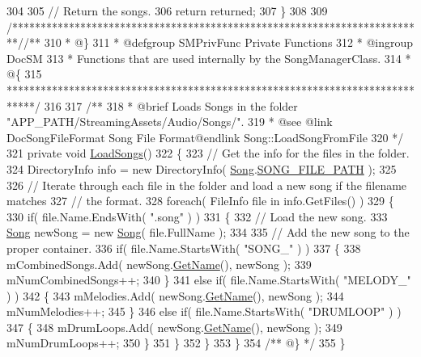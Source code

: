 \begin{DoxyCodeInclude}
304 
305         \textcolor{comment}{// Return the songs.}
306         \textcolor{keywordflow}{return} returned;
307     \}
308 
309     \textcolor{comment}{/*************************************************************************/}\textcolor{comment}{/** }
310 \textcolor{comment}{     * @\}}
311 \textcolor{comment}{     * @defgroup SMPrivFunc Private Functions}
312 \textcolor{comment}{     * @ingroup DocSM}
313 \textcolor{comment}{     * Functions that are used internally by the SongManagerClass.}
314 \textcolor{comment}{     * @\{}
315 \textcolor{comment}{    *****************************************************************************/}
316 \textcolor{comment}{}
317 \textcolor{comment}{    /**}
318 \textcolor{comment}{     * @brief Loads Songs in the folder "APP\_PATH/StreamingAssets/Audio/Songs/".}
319 \textcolor{comment}{     * @see @link DocSongFileFormat Song File Format@endlink Song::LoadSongFromFile}
320 \textcolor{comment}{    */}
321     \textcolor{keyword}{private} \textcolor{keywordtype}{void} \hyperlink{group___s_m_priv_func_ga73d6d3b38a160fd73b63b786b9cd384a}{LoadSongs}()
322     \{
323         \textcolor{comment}{// Get the info for the files in the folder.}
324         DirectoryInfo info = \textcolor{keyword}{new} DirectoryInfo( \hyperlink{class_song}{Song}.\hyperlink{group___song_const_ga95247572cf734f9e8b35973de4eeb1a4}{SONG\_FILE\_PATH} );
325 
326         \textcolor{comment}{// Iterate through each file in the folder and load a new song if the filename matches }
327         \textcolor{comment}{// the format.}
328         \textcolor{keywordflow}{foreach}( FileInfo file \textcolor{keywordflow}{in} info.GetFiles() )
329         \{
330             \textcolor{keywordflow}{if}( file.Name.EndsWith( \textcolor{stringliteral}{".song"} ) )
331             \{
332                 \textcolor{comment}{// Load the new song.}
333                 \hyperlink{class_song}{Song} newSong = \textcolor{keyword}{new} \hyperlink{class_song}{Song}( file.FullName );
334 
335                 \textcolor{comment}{// Add the new song to the proper container.}
336                 \textcolor{keywordflow}{if}( file.Name.StartsWith( \textcolor{stringliteral}{"SONG\_"} ) )
337                 \{
338                     mCombinedSongs.Add( newSong.\hyperlink{group___song_pub_func_ga705c433f2bfb5aede337698144b23c8b}{GetName}(), newSong );
339                     mNumCombinedSongs++;
340                 \}
341                 \textcolor{keywordflow}{else} \textcolor{keywordflow}{if}( file.Name.StartsWith( \textcolor{stringliteral}{"MELODY\_"} ) )
342                 \{
343                     mMelodies.Add( newSong.\hyperlink{group___song_pub_func_ga705c433f2bfb5aede337698144b23c8b}{GetName}(), newSong );
344                     mNumMelodies++;
345                 \}
346                 \textcolor{keywordflow}{else} \textcolor{keywordflow}{if}( file.Name.StartsWith( \textcolor{stringliteral}{"DRUMLOOP"} ) )
347                 \{
348                     mDrumLoops.Add( newSong.\hyperlink{group___song_pub_func_ga705c433f2bfb5aede337698144b23c8b}{GetName}(), newSong );
349                     mNumDrumLoops++;
350                 \}
351             \}
352         \}
353     \}\textcolor{comment}{}
354 \textcolor{comment}{    /** @\} */}
355 \}
\end{DoxyCodeInclude}
 
